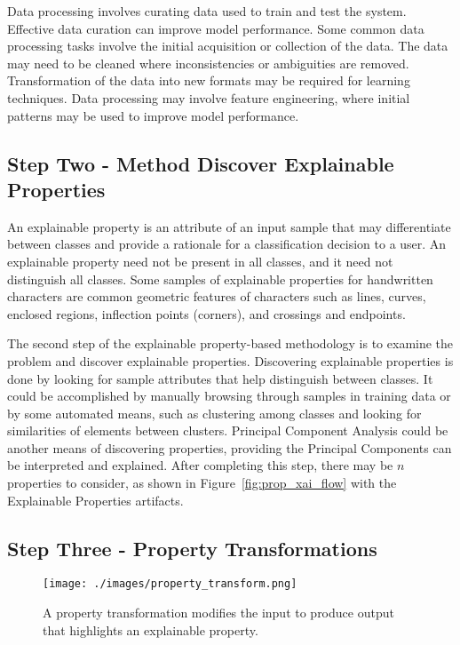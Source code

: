 Data processing involves curating data used to train and test the system.
Effective data curation can improve model performance. Some common data
processing tasks involve the initial acquisition or collection of the data. The
data may need to be cleaned where inconsistencies or ambiguities are removed.
Transformation of the data into new formats may be required for learning
techniques. Data processing may involve feature engineering, where initial
patterns may be used to improve model performance.

\subsection{Step Two - Method Discover Explainable Properties} %

An explainable property is an attribute of an input sample that may
differentiate between classes and provide a rationale for a classification
decision to a user. An explainable property need not be present in all classes,
and it need not distinguish all classes. Some samples of explainable properties
for handwritten characters are common geometric features of characters such as
lines, curves, enclosed regions, inflection points (corners), and crossings and
endpoints.

The second step of the explainable property-based methodology is to examine the
problem and discover explainable properties. Discovering explainable properties
is done by looking for sample attributes that help distinguish between classes.
It could be accomplished by manually browsing through samples in training data
or by some automated means, such as clustering among classes and looking for
similarities of elements between clusters. Principal Component Analysis could be
another means of discovering properties, providing the Principal Components can
be interpreted and explained. After completing this step, there may be $n$
properties to consider, as shown in Figure~\ref{fig:prop_xai_flow} with the
Explainable Properties artifacts.


\subsection{Step Three - Property Transformations} %


\begin{figure}[h]
    \centering
    \texttt{[image: ./images/property\_transform.png]}
    \caption{A property transformation modifies the input to produce output that highlights an explainable property.}
    \label{fig:property_transform_ex}
\end{figure}

